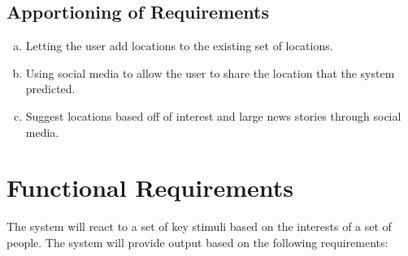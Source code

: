 \documentclass[titlepage]{article}
\begin{document}
		\subsection{Apportioning of Requirements}
		\label{sub:apportioning_of_requirements}
		\begin{enumerate}[a)]
			\item Letting the user add locations to the existing set of locations.
			\item Using social media to allow the user to share the location that the system predicted.
			\item Suggest locations based off of interest and large news stories through social media.
			
		\end{enumerate}
		
		\section{Functional Requirements}
		\label{sec:functional_requirements}
		
		The system will react to a set of key stimuli based on the interests of a set of people. The system will provide output based on the following requirements:
		
\end{document}
